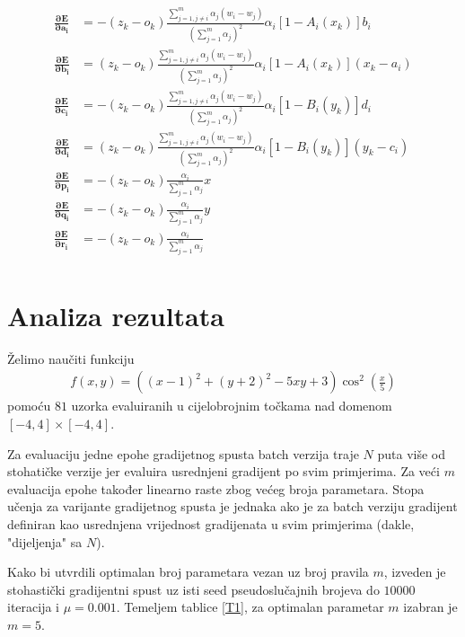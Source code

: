 \documentclass[paper=a4, fontsize=11pt]{scrartcl} %
\numberwithin{equation}{section} %
\numberwithin{figure}{section} %
\numberwithin{table}{section} %
\begin{document}
\begin{align*}
\mathbf{\frac{\partial E}{\partial a_i}} &= - (z_k - o_k) \frac{\sum_{j = 1, j \neq i}^{m} \alpha_j (w_i - w_j)}{(\sum_{j=1}^{m} \alpha_j)^2 } \alpha_i [1 - A_i(x_k)]b_i \\
\mathbf{\frac{\partial E}{\partial b_i}} &= (z_k - o_k) \frac{\sum_{j = 1, j \neq i}^{m} \alpha_j (w_i - w_j)}{(\sum_{j=1}^{m} \alpha_j)^2 } \alpha_i [1 - A_i(x_k)](x_k - a_i) \\
\mathbf{\frac{\partial E}{\partial c_i}}  &= -(z_k - o_k) \frac{\sum_{j = 1, j \neq i}^{m} \alpha_j (w_i - w_j)}{(\sum_{j=1}^{m} \alpha_j)^2 } \alpha_i [1 - B_i(y_k)]d_i \\
\mathbf{\frac{\partial E}{\partial d_i}} &= (z_k - o_k) \frac{\sum_{j = 1, j \neq i}^{m} \alpha_j (w_i - w_j)}{(\sum_{j=1}^{m} \alpha_j)^2 } \alpha_i [1 - B_i(y_k)](y_k - c_i)\\
\mathbf{\frac{\partial E}{\partial p_i}} &= - (z_k - o_k) \frac{\alpha_i}{\sum_{j=1}^{m} \alpha_j} x \\
\mathbf{\frac{\partial E}{\partial q_i}} &= - (z_k - o_k) \frac{\alpha_i}{\sum_{j=1}^{m} \alpha_j} y \\
\mathbf{\frac{\partial E}{\partial r_i}} &= - (z_k - o_k) \frac{\alpha_i}{\sum_{j=1}^{m} \alpha_j} \\
\end{align*}


\section{Analiza rezultata}
Želimo naučiti funkciju 
\begin{align*}
f(x, y) = ((x - 1) ^ 2 + (y + 2)^ 2 - 5xy + 3) {\cos^2(\frac{x}{5})}
\end{align*}
pomoću $81$ uzorka evaluiranih u cijelobrojnim točkama nad domenom $[-4, 4]\times[-4, 4]$.

Za evaluaciju jedne epohe gradijetnog spusta batch verzija traje $N$ puta više od stohatičke verzije jer evaluira usrednjeni gradijent po svim primjerima. Za veći $m$ evaluacija epohe također linearno raste zbog većeg broja parametara. Stopa učenja za varijante gradijetnog spusta je jednaka ako je za batch verziju gradijent definiran kao usrednjena vrijednost gradijenata u svim primjerima (dakle, "dijeljenja" sa $N$).

Kako bi utvrdili optimalan broj parametara vezan uz broj pravila $m$, izveden je stohastički gradijentni spust uz isti seed pseudoslučajnih brojeva do $10000$ iteracija i $\mu = 0.001$. Temeljem tablice \ref{T1}, za optimalan parametar $m$ izabran je $m=5$.
\end{document}

